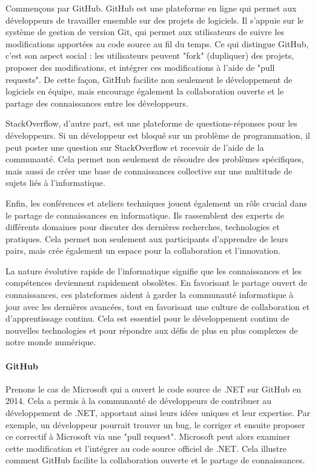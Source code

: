 Commençons par GitHub. GitHub est une plateforme en ligne qui permet aux développeurs de travailler ensemble sur des projets de logiciels. Il s'appuie sur le système de gestion de version Git, qui permet aux utilisateurs de suivre les modifications apportées au code source au fil du temps. Ce qui distingue GitHub, c'est son aspect social : les utilisateurs peuvent "fork" (dupliquer) des projets, proposer des modifications, et intégrer ces modifications à l'aide de "pull requests". De cette façon, GitHub facilite non seulement le développement de logiciels en équipe, mais encourage également la collaboration ouverte et le partage des connaissances entre les développeurs.

StackOverflow, d'autre part, est une plateforme de questions-réponses pour les développeurs. Si un développeur est bloqué sur un problème de programmation, il peut poster une question sur StackOverflow et recevoir de l'aide de la communauté. Cela permet non seulement de résoudre des problèmes spécifiques, mais aussi de créer une base de connaissances collective sur une multitude de sujets liés à l'informatique.

Enfin, les conférences et ateliers techniques jouent également un rôle crucial dans le partage de connaissances en informatique. Ils rassemblent des experts de différents domaines pour discuter des dernières recherches, technologies et pratiques. Cela permet non seulement aux participants d'apprendre de leurs pairs, mais crée également un espace pour la collaboration et l'innovation.

La nature évolutive rapide de l'informatique signifie que les connaissances et les compétences deviennent rapidement obsolètes. En favorisant le partage ouvert de connaissances, ces plateformes aident à garder la communauté informatique à jour avec les dernières avancées, tout en favorisant une culture de collaboration et d'apprentissage continu. Cela est essentiel pour le développement continu de nouvelles technologies et pour répondre aux défis de plus en plus complexes de notre monde numérique.

\paragraph*{GitHub} Prenons le cas de Microsoft qui a ouvert le code source de .NET sur GitHub en 2014. Cela a permis à la communauté de développeurs de contribuer au développement de .NET, apportant ainsi leurs idées uniques et leur expertise. Par exemple, un développeur pourrait trouver un bug, le corriger et ensuite proposer ce correctif à Microsoft via une "pull request". Microsoft peut alors examiner cette modification et l'intégrer au code source officiel de .NET. Cela illustre comment GitHub facilite la collaboration ouverte et le partage de connaissances.

